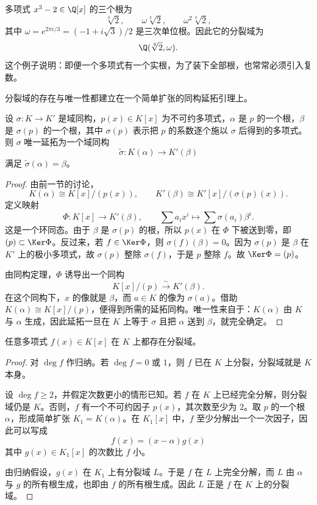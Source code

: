 \begin{example}
多项式 $x^3-2\in\Q[x]$ 的三个根为
\[
\sqrt[3]{2},\qquad \omega\sqrt[3]{2},\qquad \omega^2\sqrt[3]{2},
\]
其中 $\omega=e^{2\pi i/3}=(-1+i\sqrt3)/2$ 是三次单位根。因此它的分裂域为
\[
\Q(\sqrt[3]{2},\omega).
\]
这个例子说明：即便一个多项式有一个实根，为了装下全部根，也常常必须引入复数。
\end{example}

分裂域的存在与唯一性都建立在一个简单扩张的同构延拓引理上。

\begin{lemma}[简单扩张的同构延拓]
设 $\sigma:K\to K'$ 是域同构，$p(x)\in K[x]$ 为不可约多项式，$\alpha$ 是 $p$ 的一个根，$\beta$ 是 $\sigma(p)$ 的一个根，其中 $\sigma(p)$ 表示把 $p$ 的系数逐个施以 $\sigma$ 后得到的多项式。则 $\sigma$ 唯一延拓为一个域同构
\[
\widetilde\sigma:K(\alpha)\longrightarrow K'(\beta)
\]
满足 $\widetilde\sigma(\alpha)=\beta$。
\end{lemma}

\begin{proof}
由前一节的讨论，
\[
K(\alpha)\cong K[x]/(p(x)),\qquad K'(\beta)\cong K'[x]/(\sigma(p)(x)).
\]
定义映射
\[
\Phi:K[x]\longrightarrow K'(\beta),\qquad \sum a_i x^i\longmapsto \sum \sigma(a_i)\beta^i.
\]
这是一个环同态。由于 $\beta$ 是 $\sigma(p)$ 的根，所以 $p(x)$ 在 $\Phi$ 下被送到零，即 $(p)\subset\Ker\Phi$。反过来，若 $f\in\Ker\Phi$，则 $\sigma(f)(\beta)=0$。因为 $\sigma(p)$ 是 $\beta$ 在 $K'$ 上的极小多项式，故 $\sigma(p)$ 整除 $\sigma(f)$，于是 $p$ 整除 $f$。故 $\Ker\Phi=(p)$。

由同构定理，$\Phi$ 诱导出一个同构
\[
K[x]/(p)\xrightarrow{\sim} K'(\beta).
\]
在这个同构下，$x$ 的像就是 $\beta$，而 $a\in K$ 的像为 $\sigma(a)$。借助 $K(\alpha)\cong K[x]/(p)$，便得到所需的延拓同构。唯一性来自于：$K(\alpha)$ 由 $K$ 与 $\alpha$ 生成，因此延拓一旦在 $K$ 上等于 $\sigma$ 且把 $\alpha$ 送到 $\beta$，就完全确定。
\end{proof}

\begin{theorem}[分裂域的存在]
任意多项式 $f(x)\in K[x]$ 在 $K$ 上都存在分裂域。
\end{theorem}

\begin{proof}
对 $\deg f$ 作归纳。若 $\deg f=0$ 或 $1$，则 $f$ 已在 $K$ 上分裂，分裂域就是 $K$ 本身。

设 $\deg f\ge2$，并假定次数更小的情形已知。若 $f$ 在 $K$ 上已经完全分解，则分裂域仍是 $K$。否则，$f$ 有一个不可约因子 $p(x)$，其次数至少为 $2$。取 $p$ 的一个根 $\alpha$，形成简单扩张 $K_1=K(\alpha)$。在 $K_1[x]$ 中，$f$ 至少分解出一个一次因子，因此可以写成
\[
f(x)=(x-\alpha)g(x)
\]
其中 $g(x)\in K_1[x]$ 的次数比 $f$ 小。

由归纳假设，$g(x)$ 在 $K_1$ 上有分裂域 $L$。于是 $f$ 在 $L$ 上完全分解，而 $L$ 由 $\alpha$ 与 $g$ 的所有根生成，也即由 $f$ 的所有根生成。因此 $L$ 正是 $f$ 在 $K$ 上的分裂域。
\end{proof}

